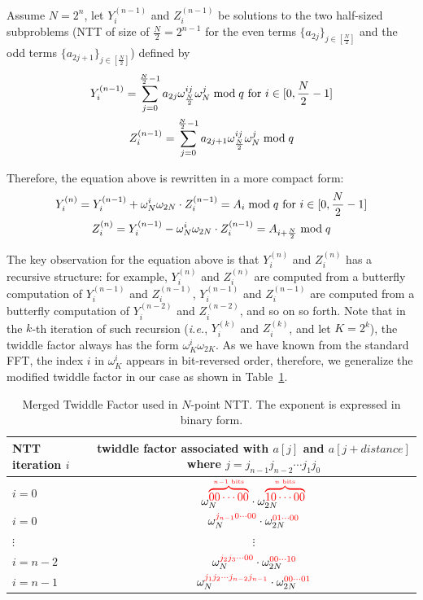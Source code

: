 \documentclass{iacrtrans}
\theoremstyle{plain}
\begin{document}
Assume $N=2^n$, let $Y_i^{(n-1)}$ and $Z_i^{(n-1)}$ be solutions to the two half-sized subproblems (NTT of size of $\frac{N}{2}=2^{n-1}$ for the even terms $\{a_{2j}\}_{j\in [\frac{N}{2}]}$ and the odd terms $\{a_{2j+1}\}_{j\in [\frac{N}{2}]}$) defined by
\begin{gather}
    Y_i^{(n-1)} = \sum_{j=0}^{\frac{N}{2}-1}a_{2j}\omega_{\frac{N}{2}}^{ij}\omega_{N}^{j} \bmod q \text{ for } i\in [0,\frac{N}{2}-1]\notag\\
    Z_i^{(n-1)} = \sum_{j=0}^{\frac{N}{2}-1}a_{2j+1}\omega_{\frac{N}{2}}^{ij}\omega_N^{j} \bmod q \notag
\end{gather}

Therefore, the equation above is rewritten in a more compact form:
\begin{gather}
    Y_i^{(n)} = Y_i^{(n-1)} + \omega_{N}^i\omega_{2N}\cdot Z_i^{(n-1)} = A_i\bmod q \text{ for } i\in [0,\frac{N}{2}-1]\notag\\
    Z_i^{(n)} = Y_i^{(n-1)} - \omega_{N}^i\omega_{2N}\cdot Z_i^{(n-1)} = A_{i+\frac{N}{2}} \bmod q \notag
\end{gather}

The key observation for the equation above is that $Y_i^{(n)}$ and $Z_i^{(n)}$ has a recursive structure: for example, $Y_i^{(n)}$ and $Z_i^{(n)}$ are computed from a butterfly computation of  $Y_i^{(n-1)}$ and $Z_i^{(n-1)}$, $Y_i^{(n-1)}$ and $Z_i^{(n-1)}$ are computed from a butterfly computation of $Y_i^{(n-2)}$ and $Z_i^{(n-2)}$, and so on so forth. Note that in the $k$-th iteration of such recursion (\textit{i.e.}, $Y_i^{(k)}$ and $Z_i^{(k)}$, and let $K=2^k$), the twiddle factor always has the form $\omega_K^i\omega_{2K}$. As we have known from the standard FFT, the index $i$ in $\omega_K^i$ appears in bit-reversed order, therefore, we generalize the modified twiddle factor in our case as shown in Table~\ref{table:merged_tf}.
\begin{table}\centering
\begin{tabular}{lc}
 \hline
 NTT iteration $i$ & \makecell{twiddle factor associated with $a[j]$ and\\ $a[j+distance]$ where $j=j_{n-1}j_{n-2}\cdots j_{1}j_{0}$}\\
 \hline
 $i=0$ & $\omega_{N}^{\textcolor{red}{\overbrace{00\cdots00}^{n-1 \text{ bits}}}}\cdot \omega_{2N}^{\textcolor{red}{\overbrace{10\cdots00}^{n \text{ bits}}}}$\\
 $i=0$ & $\omega_{N}^{\textcolor{red}{j_{n-1}0\cdots 00}}\cdot\omega_{2N}^{\textcolor{red}{01\cdots 00}}$ \\
 $\vdots$ & $\vdots$ \\
 $i=n-2$ & $\omega_{N}^{\textcolor{red}{j_{2}j_{3}\cdots 00}}\cdot \omega_{2N}^{\textcolor{red}{00\cdots 10}}$\\
 $i=n-1$ & $\omega_{N}^{\textcolor{red}{j_{1}j_{2}\cdots j_{n-2}j_{n-1}}}\cdot \omega_{2N}^{\textcolor{red}{00\cdots 01}}$\\
 \hline
 \end{tabular}

   \caption{Merged Twiddle Factor used in $N$-point NTT. The exponent is expressed in binary form.}
  \label{table:merged_tf}
 \end{table}
\end{document}
